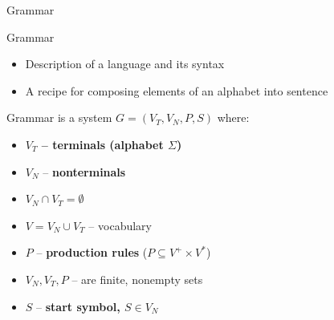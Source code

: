 \documentclass{beamer}
\begin{document}
\begin{frame}{Grammar}

\begin{block}{Grammar}
	\begin{itemize}
		\item Description of a language and its syntax
		\item A recipe for composing elements of an alphabet into sentence
	\end{itemize}
\end{block}

\begin{definition}{Grammar}
is a system $G = (V_T, V_N, P, S)$ where:
	\begin{itemize}
		\item \textbf{$V_T$ -- terminals (alphabet $\Sigma$)}
		\item $V_N$ -- \textbf{nonterminals}
		\item $V_N \cap V_T = \emptyset$
		\item $V = V_N \cup V_T$ -- vocabulary
		\item $P$ -- \textbf{production rules} ($P \subseteq V^{+} \times V^{\ast}$)
		\item $V_N, V_T, P$ -- are finite, nonempty sets
		\item $S$ -- \textbf{start symbol, $S\in V_N$}
	\end{itemize}
\end{definition}

\end{frame}
\end{document}
